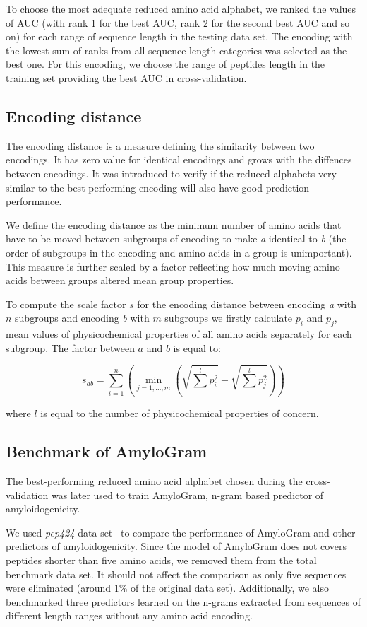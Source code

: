 \documentclass{bioinfo}
\begin{document}
\begin{methods}
  To choose the most adequate reduced amino acid alphabet, we ranked the values 
of AUC (with rank 1 for the best AUC, rank 2 for the second best AUC and so on) 
for each range of sequence length in the testing data set. The encoding with 
the lowest sum of ranks from all sequence length categories was selected as 
the best one. For this encoding, we choose the range of peptides length in the 
training set providing the best AUC in cross-validation.

\subsection{Encoding distance}
The encoding distance is a measure defining the similarity between two 
encodings. It has zero value for identical encodings and grows with the 
diffences between encodings. It was introduced to verify if the reduced 
alphabets very similar to the best performing encoding will also have good 
prediction performance.

  We define the encoding distance as the minimum number of amino acids that 
have to be moved between subgroups of encoding to make \textit{a} identical to 
\textit{b} (the order of subgroups in the encoding and amino acids in a group 
is unimportant). This measure is further scaled by a factor reflecting how 
much moving amino acids between groups altered mean group properties. 

To compute the scale factor $s$ for the encoding distance between 
encoding \textit{a} with $n$ subgroups and encoding \textit{b} with $m$ 
subgroups we firstly calculate $p_i$ and $p_j$, mean values of physicochemical 
properties of all amino acids separately for each subgroup. The factor between 
$a$ and $b$ is equal to: 

$$
s_{ab} = \sum^n_{i = 1}  \left( \min_{j=1,\dots,m} \left(\sqrt{\sum^l p_{i}^2} 
- \sqrt{\sum^l p_{j}^2} \right) \right)
$$
 
where $l$ is equal to the number of physicochemical properties of concern.

\subsection{Benchmark of AmyloGram}

The best-performing reduced amino acid alphabet chosen during the 
cross-validation was later used to train AmyloGram, n-gram based predictor of 
amyloidogenicity.

  We used \textit{pep424} data set~\citep{walsh_pasta_2014} to compare the 
performance of AmyloGram and other predictors of amyloidogenicity. Since the 
model of AmyloGram does not covers peptides shorter than five amino acids, we 
removed them from the total benchmark data set. It should not affect the 
comparison as only five sequences were eliminated (around 1\% of the original 
data set). Additionally, we also benchmarked three predictors learned on the 
n-grams extracted from sequences of different length ranges without any amino 
acid encoding.


\end{methods}
\end{document}
